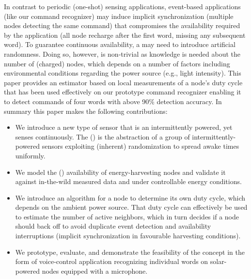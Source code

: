 In contrast to periodic (one-shot) sensing applications, event-based applications (like our command recognizer) may induce implicit synchronization (multiple nodes detecting the same command) that compromises the availability required by the application (all node recharge after the first word, missing any subsequent word). To guarantee continuous availability, a \sys may need to introduce artificial randomness. Doing so, however, is non-trivial as knowledge is needed about the number of (charged) nodes, which depends on a number of factors including environmental conditions regarding the power source (e.g., light intensity). This paper provides an estimator based on local measurements of a node's duty cycle that has been used effectively on our prototype command recognizer enabling it to detect commands of four words with above 90\% detection accuracy. 
In summary this paper makes the following contributions:
\begin{itemize}
		\item We introduce a new type of sensor that is an intermittently powered, yet senses continuously. The \textit{\fullsys} (\sys) is the abstraction of a group of intermittently-powered sensors exploiting (inherent) randomization to spread awake times uniformly.
		\item We model the (\sys) availability of energy-harvesting nodes and validate it against in-the-wild measured data and under controllable energy conditions.   
		\item We introduce an algorithm for a node to determine its own duty cycle, which depends on the ambient power source. That duty cycle can effectively be used to estimate the number of active neighbors, which in turn decides if a node should back off to avoid duplicate event detection and availability interruptions (implicit synchronization in favourable harvesting conditions).
		\item We prototype, evaluate, and demonstrate the feasibility of the \fullsys concept in the form of voice-control application recognizing individual words on solar-powered nodes equipped with a microphone.
\end{itemize}

